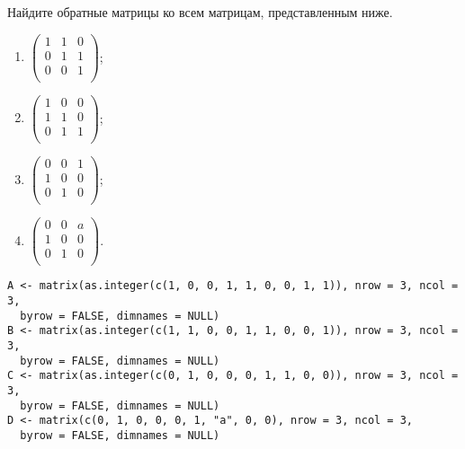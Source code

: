 \begin{problem}
Найдите обратные матрицы ко всем матрицам, представленным ниже.
\begin{enumerate}
\item $\begin{pmatrix}{}
    1 &   1 &   0 \\ 
    0 &   1 &   1 \\ 
    0 &   0 &   1 \\ 
  \end{pmatrix}$;
\item $\begin{pmatrix}{}
    1 &   0 &   0 \\ 
    1 &   1 &   0 \\ 
    0 &   1 &   1 \\ 
  \end{pmatrix}$;
\item $\begin{pmatrix}{}
    0 &   0 &   1 \\ 
    1 &   0 &   0 \\ 
    0 &   1 &   0 \\ 
  \end{pmatrix}$;
\item $\begin{pmatrix}{}
  0 & 0 & a \\ 
  1 & 0 & 0 \\ 
  0 & 1 & 0 \\ 
  \end{pmatrix}$.
\end{enumerate}


\begin{sol}

\begin{verbatim}
A <- matrix(as.integer(c(1, 0, 0, 1, 1, 0, 0, 1, 1)), nrow = 3, ncol = 3,
  byrow = FALSE, dimnames = NULL)
B <- matrix(as.integer(c(1, 1, 0, 0, 1, 1, 0, 0, 1)), nrow = 3, ncol = 3,
  byrow = FALSE, dimnames = NULL)
C <- matrix(as.integer(c(0, 1, 0, 0, 0, 1, 1, 0, 0)), nrow = 3, ncol = 3,
  byrow = FALSE, dimnames = NULL)
D <- matrix(c(0, 1, 0, 0, 0, 1, "a", 0, 0), nrow = 3, ncol = 3,
  byrow = FALSE, dimnames = NULL)
\end{verbatim}


\end{sol}
\end{problem}



